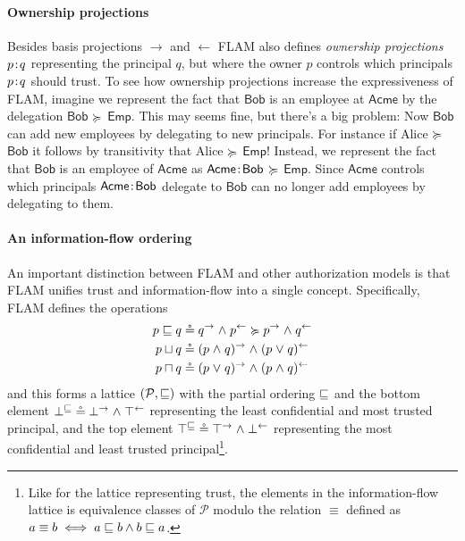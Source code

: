 \paragraph{Ownership projections}
Besides basis projections $\rightarrow$ and $\leftarrow$ FLAM also defines \emph{ownership projections} $p\!:\!q$ representing the principal $q$, but where the owner $p$ controls which principals $p\!:\!q$ should trust. To see how ownership projections increase the expressiveness of FLAM, imagine we represent the fact that $\mathsf{Bob}$ is an employee at $\mathsf{Acme}$ by the delegation $\mathsf{Bob}$ $\succcurlyeq$ $\mathsf{Emp}$. This may seems fine, but there's a big problem: Now $\mathsf{Bob}$ can add new employees by delegating to new principals. For instance if Alice $\succcurlyeq$ $\mathsf{Bob}$ it follows by transitivity that Alice $\succcurlyeq$ $\mathsf{Emp}$! Instead, we represent the fact that $\mathsf{Bob}$ is an employee of $\mathsf{Acme}$ as $\mathsf{Acme}\!:\!\mathsf{Bob}$ $\succcurlyeq$ $\mathsf{Emp}$. Since $\mathsf{Acme}$ controls which principals $\mathsf{Acme}\!:\!\mathsf{Bob}$ delegate to $\mathsf{Bob}$ can no longer add employees by delegating to them.

\paragraph{An information-flow ordering}
An important distinction between FLAM and other authorization models is that FLAM unifies trust and information-flow into a single concept. Specifically, FLAM defines the operations
\begin{align*}
p \sqsubseteq q &\circeq q^{\rightarrow} \mathrel{\land} p^{\leftarrow} \succcurlyeq p^{\rightarrow} \mathrel{\land} q^{\leftarrow}\\
p \sqcup q &\circeq (p \mathrel{\land} q)^{\rightarrow} \mathrel{\land} (p \mathrel{\lor} q)^{\leftarrow} \\
p \sqcap q &\circeq (p \mathrel{\lor} q)^{\rightarrow} \mathrel{\land} (p \mathrel{\land} q)^{\leftarrow}
\end{align*}
and this forms a lattice $(\mathcal{P}, \sqsubseteq)$ with the partial ordering $\sqsubseteq$ and the bottom element $\bot^{\sqsubseteq} \circeq \bot^{\rightarrow} \mathrel{\land} \top^{\leftarrow}$ representing the least confidential and most trusted principal, and the top element $\top^{\sqsubseteq} \circeq \top^{\rightarrow} \mathrel{\land} \bot^{\leftarrow}$ representing the most confidential and least trusted principal\footnote{Like for the lattice representing trust, the elements in the information-flow lattice is equivalence classes of $\mathcal{P}$ modulo the relation $\equiv$ defined as $a \equiv b \iff a \sqsubseteq b \wedge b \sqsubseteq a$.}.

